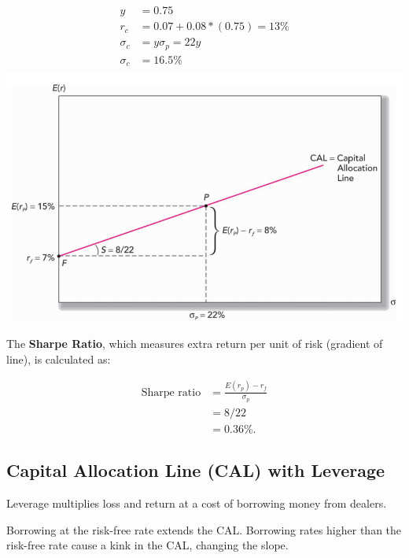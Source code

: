 \documentclass[
]{book}
\begin{document}
\[
\begin{aligned}
y        &= 0.75 \\
r_𝑐     &= 0.07+0.08*(0.75) = 13\% \\
\sigma_c &= y \sigma_𝑝=22𝑦\\
\sigma_c &= 16.5\% \\
\end{aligned}
\]
\includegraphics{Resources/capaloocation1.png}

The \textbf{Sharpe Ratio}, which measures extra return per unit of risk (gradient of line), is calculated as:

\[
\begin{aligned}
\text{Sharpe ratio} &= \frac{E(r_p) - r_f}{ \sigma_p}\\
&= 8/22 \\
&= 0.36\%. 
\end{aligned}
\]

\hypertarget{capital-allocation-line-cal-with-leverage}{%
\subsection{Capital Allocation Line (CAL) with Leverage}\label{capital-allocation-line-cal-with-leverage}}

Leverage multiplies loss and return at a cost of borrowing money from dealers.

Borrowing at the risk-free rate extends the CAL. Borrowing rates higher than the risk-free rate cause a kink in the CAL, changing the slope.
\end{document}

